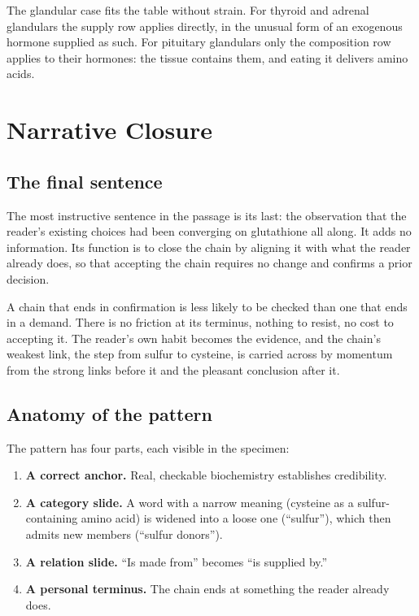 \documentclass[11pt,a4paper]{article}
\theoremstyle{plain}
\theoremstyle{definition}
\theoremstyle{remark}
\begin{document}
The glandular case fits the table without strain. For thyroid and adrenal glandulars the supply row applies directly, in the unusual form of an exogenous hormone supplied as such. For pituitary glandulars only the composition row applies to their hormones: the tissue contains them, and eating it delivers amino acids.

\section{Narrative Closure}

\subsection{The final sentence}

The most instructive sentence in the passage is its last: the observation that the reader's existing choices had been converging on glutathione all along. It adds no information. Its function is to close the chain by aligning it with what the reader already does, so that accepting the chain requires no change and confirms a prior decision.

A chain that ends in confirmation is less likely to be checked than one that ends in a demand. There is no friction at its terminus, nothing to resist, no cost to accepting it. The reader's own habit becomes the evidence, and the chain's weakest link, the step from sulfur to cysteine, is carried across by momentum from the strong links before it and the pleasant conclusion after it.

\subsection{Anatomy of the pattern}

The pattern has four parts, each visible in the specimen:
\begin{enumerate}[itemsep=3pt]
\item \textbf{A correct anchor.} Real, checkable biochemistry establishes credibility.
\item \textbf{A category slide.} A word with a narrow meaning (cysteine as a sulfur-containing amino acid) is widened into a loose one (``sulfur''), which then admits new members (``sulfur donors'').
\item \textbf{A relation slide.} ``Is made from'' becomes ``is supplied by.''
\item \textbf{A personal terminus.} The chain ends at something the reader already does.
\end{enumerate}
\end{document}
